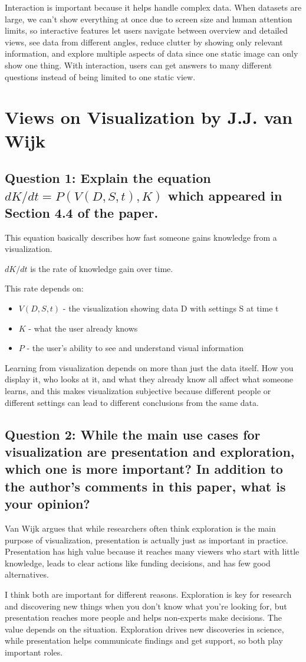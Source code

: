 \documentclass[11pt]{article}
\begin{document}
Interaction is important because it helps handle complex data. When datasets are large, we can't show everything at once due to screen size and human attention limits, so interactive features let users navigate between overview and detailed views, see data from different angles, reduce clutter by showing only relevant information, and explore multiple aspects of data since one static image can only show one thing. With interaction, users can get answers to many different questions instead of being limited to one static view.

\section*{Views on Visualization by J.J. van Wijk}

\subsection*{Question 1: Explain the equation $dK/dt = P(V(D, S, t), K)$ which appeared in Section 4.4 of the paper.}

This equation basically describes how fast someone gains knowledge from a visualization.

$dK/dt$ is the rate of knowledge gain over time.

This rate depends on:
\begin{itemize}
\item $V(D, S, t)$ - the visualization showing data D with settings S at time t
\item $K$ - what the user already knows
\item $P$ - the user's ability to see and understand visual information
\end{itemize}

Learning from visualization depends on more than just the data itself. How you display it, who looks at it, and what they already know all affect what someone learns, and this makes visualization subjective because different people or different settings can lead to different conclusions from the same data.

\subsection*{Question 2: While the main use cases for visualization are presentation and exploration, which one is more important? In addition to the author's comments in this paper, what is your opinion?}

Van Wijk argues that while researchers often think exploration is the main purpose of visualization, presentation is actually just as important in practice. Presentation has high value because it reaches many viewers who start with little knowledge, leads to clear actions like funding decisions, and has few good alternatives.

I think both are important for different reasons. Exploration is key for research and discovering new things when you don't know what you're looking for, but presentation reaches more people and helps non-experts make decisions. The value depends on the situation. Exploration drives new discoveries in science, while presentation helps communicate findings and get support, so both play important roles.
\end{document}

